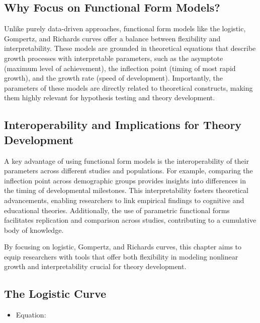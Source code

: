 \documentclass[
  letterpaper,
  DIV=11,
  numbers=noendperiod]{scrreprt}
\providecommand{\tightlist}{%
  \setlength{\itemsep}{0pt}\setlength{\parskip}{0pt}}\usepackage{longtable,booktabs,array}
\begin{document}
\subsection{Why Focus on Functional Form
Models?}\label{why-focus-on-functional-form-models}

Unlike purely data-driven approaches, functional form models like the
logistic, Gompertz, and Richards curves offer a balance between
flexibility and interpretability. These models are grounded in
theoretical equations that describe growth processes with interpretable
parameters, such as the asymptote (maximum level of achievement), the
inflection point (timing of most rapid growth), and the growth rate
(speed of development). Importantly, the parameters of these models are
directly related to theoretical constructs, making them highly relevant
for hypothesis testing and theory development.

\subsection{Interoperability and Implications for Theory
Development}\label{interoperability-and-implications-for-theory-development}

A key advantage of using functional form models is the interoperability
of their parameters across different studies and populations. For
example, comparing the inflection point across demographic groups
provides insights into differences in the timing of developmental
milestones. This interpretability fosters theoretical advancements,
enabling researchers to link empirical findings to cognitive and
educational theories. Additionally, the use of parametric functional
forms facilitates replication and comparison across studies,
contributing to a cumulative body of knowledge.

By focusing on logistic, Gompertz, and Richards curves, this chapter
aims to equip researchers with tools that offer both flexibility in
modeling nonlinear growth and interpretability crucial for theory
development.

\subsection{The Logistic Curve}\label{the-logistic-curve}

\begin{itemize}
\tightlist
\item
  Equation:
\end{itemize}
\end{document}
